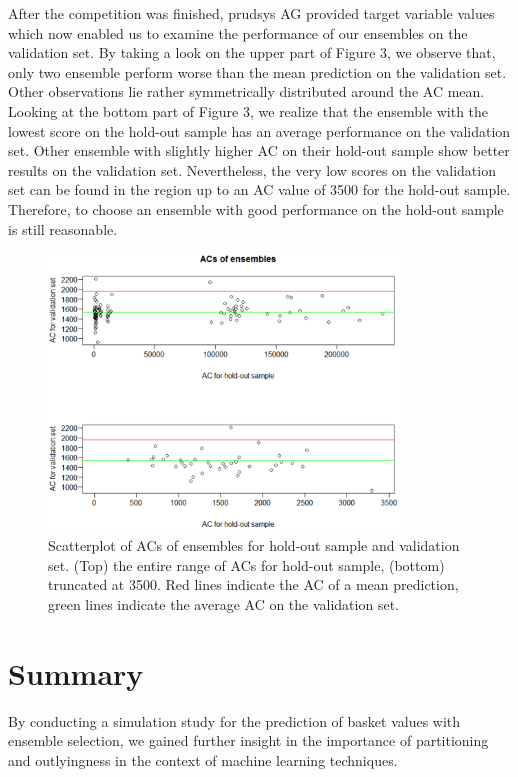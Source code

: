 After the competition was finished, prudsys AG provided target variable values which now enabled us to examine the performance of our ensembles on the validation set. By taking a look on the upper part of Figure 3, we observe that, only two ensemble perform worse than the mean prediction on the validation set. Other observations lie rather symmetrically distributed around the AC mean. Looking at the bottom part of Figure 3, we realize that the ensemble with the lowest score on the hold-out sample has an average performance on the validation set. Other ensemble with slightly higher AC on their hold-out sample show better results on the validation set. Nevertheless, the very low scores on the validation set can be found in the region up to an AC value of 3500 for the hold-out sample. Therefore, to choose an ensemble with good performance on the hold-out sample is still reasonable.\\

\begin{figure}[H]
\centering
\includegraphics[width=0.83\textwidth]{ACensemble.pdf}
\caption{Scatterplot of ACs of ensembles for hold-out sample and validation set. (Top) the entire range of ACs for hold-out sample, (bottom) truncated at 3500. Red lines indicate the AC of a mean prediction, green lines indicate the average AC on the validation set.}
\end{figure}

\section{Summary}

By conducting a simulation study for the prediction of basket values with ensemble selection, we gained further insight in the importance of partitioning and outlyingness in the context of machine learning techniques. 

